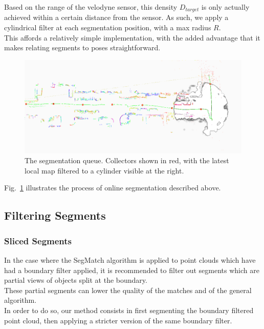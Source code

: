 Based on the range of the velodyne sensor, this density $D_{target}$ is only actually achieved within a certain distance from the sensor. As such, we apply a cylindrical filter at each segmentation position, with a max radius $R$.\\

This affords a relatively simple implementation, with the added advantage that it makes relating segments to poses straightforward.\\



\begin{figure}
  \centering
  \includegraphics[width=5.2in]{images/seg_queue.png}
  \caption{The segmentation queue. Collectors shown in red, with the latest local map filtered to a cylinder visible at the right.}
  \label{fig:seg-queue}
\end{figure}
Fig.~\ref{fig:seg-queue} illustrates the process of online segmentation described above.
\subsection{Filtering Segments}

\label{subsec:filtering-segments}

\subsubsection{Sliced Segments}
\label{subsub:sec:sliced}

In the case where the SegMatch algorithm is applied to point clouds which have had a boundary filter applied, it is recommended to filter out segments which are partial views of objects split at the boundary.\\

These partial segments can lower the quality of the matches and of the general algorithm.\\

In order to do so, our method consists in first segmenting the boundary filtered point cloud, then applying a stricter version of the same boundary filter.\\

